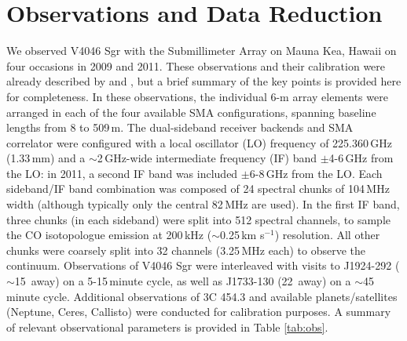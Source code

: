 {%
\section{Observations and Data Reduction} \label{sec:observations}

We observed V4046 Sgr with the Submillimeter Array \citep[SMA;][]{ho04} on
Mauna Kea, Hawaii on four occasions in 2009 and 2011.  These observations and
their calibration were already described by \citet{rodriguez10} and
\citet{rosenfeld12}, but a brief summary of the key points is provided here for
completeness.  In these observations, the individual 6-m array elements were
arranged in each of the four available SMA configurations, spanning baseline 
lengths from 8 to 509\,m.  The dual-sideband receiver backends and SMA 
correlator were configured with a local oscillator (LO) frequency of 
225.360\,GHz (1.33\,mm) and a $\sim$2\,GHz-wide intermediate frequency (IF) 
band $\pm$4-6\,GHz from the LO: in 2011, a second IF band was included 
$\pm$6-8\,GHz from the LO.  Each sideband/IF band combination was composed of 
24 spectral chunks of 104\,MHz width (although typically only the central 
82\,MHz are used).  In the first IF band, three chunks (in each sideband) were 
split into 512 spectral channels, to sample the CO isotopologue emission at 
200\,kHz ($\sim$0.25\,km s$^{-1}$) resolution.  All other chunks were coarsely 
split into 32 channels (3.25\,MHz each) to observe the continuum.  Observations 
of V4046 Sgr were interleaved with visits to J1924-292 ($\sim$15\degr\ away) on 
a 5-15\,minute cycle, as well as J1733-130 (22\degr\ away) on a 
$\sim$45\,minute cycle.  Additional observations of 3C 454.3 and available 
planets/satellites (Neptune, Ceres, Callisto) were conducted for calibration 
purposes.  A summary of relevant observational parameters is provided in Table 
\ref{tab:obs}.

}
